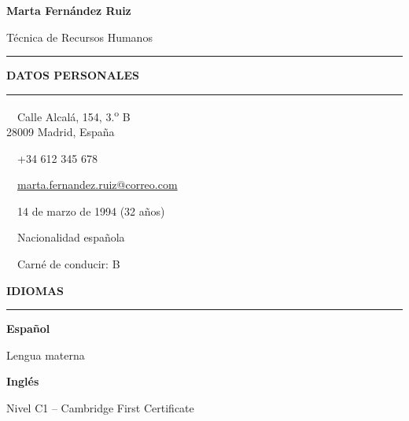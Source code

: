 \documentclass[10pt,a4paper]{article}
\newcommand{\sidesection}[1]{%
  \vspace{4pt}
  {\color{primary}\large\bfseries\MakeUppercase{#1}}\par
  \vspace{-5pt}
  {\color{primary}\rule{\linewidth}{0.7pt}}\par
  \vspace{5pt}
}
\newcommand{\jobtitle}[2]{%
  \textbf{\color{ink}#1}\hfill{\small\color{muted}#2}\par
}
\newcommand{\levelbar}[1]{%
  \ifcase#1\relax
  \or\textcolor{primary}{\faCircle}\textcolor{primary!15}{\faCircle\faCircle\faCircle\faCircle}%
  \or\textcolor{primary}{\faCircle\faCircle}\textcolor{primary!15}{\faCircle\faCircle\faCircle}%
  \or\textcolor{primary}{\faCircle\faCircle\faCircle}\textcolor{primary!15}{\faCircle\faCircle}%
  \or\textcolor{primary}{\faCircle\faCircle\faCircle\faCircle}\textcolor{primary!15}{\faCircle}%
  \or\textcolor{primary}{\faCircle\faCircle\faCircle\faCircle\faCircle}%
  \fi
}
\begin{document}
{\color{ink}\fontsize{28}{30}\selectfont\bfseries Marta Fern\'andez Ruiz}\par
\vspace{2pt}
{\color{primary}\Large T\'ecnica de Recursos Humanos}\par
\vspace{6pt}
{\color{primary}\rule{\linewidth}{1.4pt}}\par
\vspace{10pt}

\begin{minipage}[t]{0.335\textwidth}
\RaggedRight

\begin{center}
\end{center}

\vspace{8pt}

\sidesection{Datos personales}

\faMapMarker\ \ Calle Alcal\'a, 154, 3.\textsuperscript{o} B\\
28009 Madrid, Espa\~na

\vspace{4pt}
\faPhone\ \ +34 612 345 678

\vspace{4pt}
\faEnvelope\ \ \href{mailto:marta.fernandez.ruiz@correo.com}{\small marta.fernandez.ruiz@correo.com}

\vspace{4pt}
\faCalendar\ \ 14 de marzo de 1994 (32 a\~nos)

\vspace{4pt}
\faGlobe\ \ Nacionalidad espa\~nola

\vspace{4pt}
\faCar\ \ Carn\'e de conducir: B

\sidesection{Idiomas}

\jobtitle{Espa\~nol}{}
{\footnotesize\color{muted}Lengua materna}\\[2pt]
\levelbar{5}

\vspace{6pt}
\jobtitle{Ingl\'es}{}
{\footnotesize\color{muted}Nivel C1 -- Cambridge First Certificate}\\[2pt]
\levelbar{4}


\end{minipage}
\end{document}
